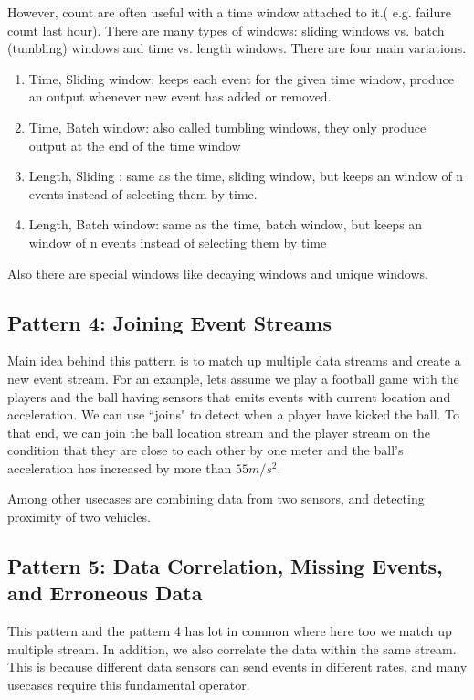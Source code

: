 \documentclass{sig-alternate}
\begin{document}
However, count are often useful with a time window attached to it.( e.g. failure count last hour). There are many types of windows: sliding windows vs. batch (tumbling) windows and time vs. length windows. There are four main variations. 

\begin{enumerate}
\item Time, Sliding window: keeps each event for the given time window, produce an output whenever new event has added or removed. 
\item Time, Batch window: also called tumbling windows, they only produce output at the end of the time window
\item Length, Sliding : same as the time, sliding window, but keeps an window of n events instead of selecting them by time.
\item Length, Batch window: same as the time, batch window, but keeps an window of n events instead of selecting them by time
\end{enumerate}

Also there are special windows like decaying windows and unique windows. 


\subsection{Pattern 4: Joining Event Streams}
Main idea behind this pattern is to match up multiple data streams and create a new event stream. For an example, lets assume we play a football game with the players and the ball having sensors that emits events with current location and acceleration. We can use ``joins" to detect when a player have kicked the ball. To that end, we can join the ball location stream and the player stream on the condition that they are close to each other by one meter and the ball's acceleration has increased by more than $55m/s^2$.

Among other usecases are combining data from two sensors, and detecting proximity of two vehicles. 

\subsection{Pattern 5: Data Correlation, Missing Events, and Erroneous Data}
This pattern and the pattern 4 has lot in common where here too we match up multiple stream. In addition, we also correlate the data within the same stream. This is because different data sensors can send events in different rates, and many usecases require this fundamental operator. 
\end{document}
